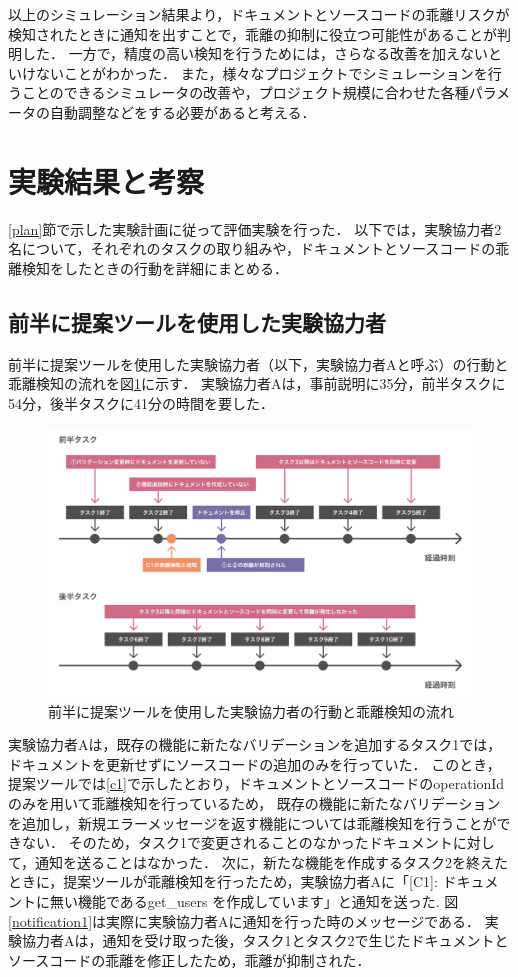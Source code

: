 以上のシミュレーション結果より，ドキュメントとソースコードの乖離リスクが検知されたときに通知を出すことで，乖離の抑制に役立つ可能性があることが判明した．
一方で，精度の高い検知を行うためには，さらなる改善を加えないといけないことがわかった．
また，様々なプロジェクトでシミュレーションを行うことのできるシミュレータの改善や，プロジェクト規模に合わせた各種パラメータの自動調整などをする必要があると考える．


\section{実験結果と考察}
\ref{plan}節で示した実験計画に従って評価実験を行った．
以下では，実験協力者2名について，それぞれのタスクの取り組みや，ドキュメントとソースコードの乖離検知をしたときの行動を詳細にまとめる．

\subsection{前半に提案ツールを使用した実験協力者}
前半に提案ツールを使用した実験協力者（以下，実験協力者Aと呼ぶ）の行動と乖離検知の流れを図\ref{usera}に示す．
実験協力者Aは，事前説明に35分，前半タスクに54分，後半タスクに41分の時間を要した．
\begin{figure}[H]
    \centering
    \includegraphics[width=14cm]{images/usera.png}
    \caption{前半に提案ツールを使用した実験協力者の行動と乖離検知の流れ}
    \label{usera}
\end{figure}

実験協力者Aは，既存の機能に新たなバリデーションを追加するタスク1では，ドキュメントを更新せずにソースコードの追加のみを行っていた．
このとき，提案ツールでは\ref{c1}で示したとおり，ドキュメントとソースコードのoperationIdのみを用いて乖離検知を行っているため，
既存の機能に新たなバリデーションを追加し，新規エラーメッセージを返す機能については乖離検知を行うことができない．
そのため，タスク1で変更されることのなかったドキュメントに対して，通知を送ることはなかった．
次に，新たな機能を作成するタスク2を終えたときに，提案ツールが乖離検知を行ったため，実験協力者Aに「[C1]: ドキュメントに無い機能であるget\_users を作成しています」と通知を送った.
図\ref{notification1}は実際に実験協力者Aに通知を行った時のメッセージである．
実験協力者Aは，通知を受け取った後，タスク1とタスク2で生じたドキュメントとソースコードの乖離を修正したため，乖離が抑制された．

